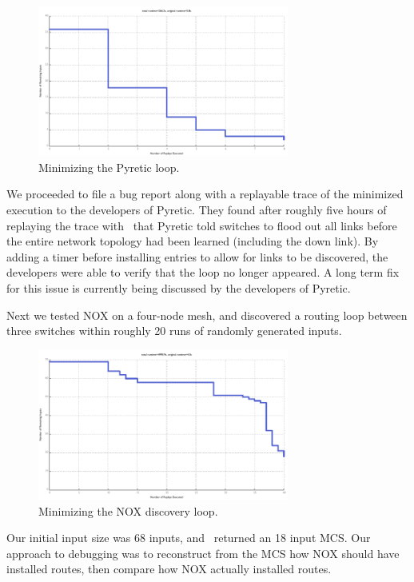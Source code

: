 \begin{figure}[t]
    \includegraphics[width=3.25in]{../graphs/runtime/pyretic_loop.pdf}
    \caption[]{\label{fig:pyretic_loop} Minimizing the Pyretic loop.}
\end{figure}

We proceeded to file a bug report along with a replayable trace of the
minimized execution to the developers of Pyretic. They found after roughly
five hours of replaying the trace with \projectname~that Pyretic told switches to
flood out all links before the entire
network topology had been learned (including the down link). By adding a timer before installing
entries to allow for links to be discovered, the developers were able to verify
that the loop no longer appeared. A long term fix for this issue is currently being discussed by the developers of
Pyretic.

 Next we tested NOX on a four-node mesh, and discovered a
routing loop between three switches within
roughly 20 runs of randomly generated inputs.

\begin{figure}[t]
    \includegraphics[width=3.25in]{../graphs/runtime/nox_loop.pdf}
    \caption[]{\label{fig:nox_discovery} Minimizing the NOX discovery loop.}
\end{figure}

Our initial input size was 68 inputs, and
\projectname~returned an 18 input MCS.
Our approach to debugging was to
reconstruct from the MCS how NOX should have installed routes, then compare
how NOX actually installed routes.

